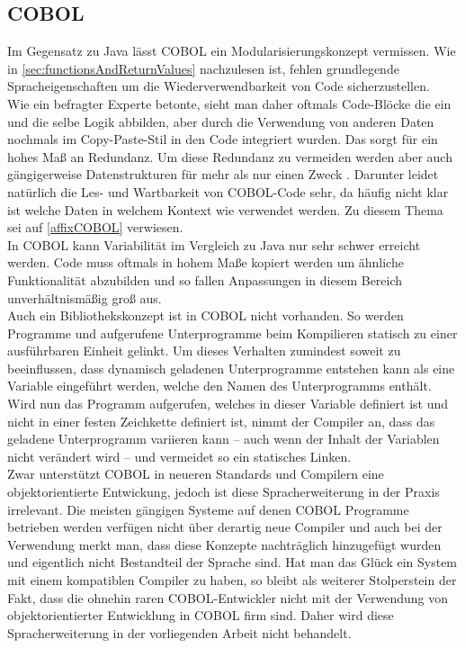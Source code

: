 \subsection*{COBOL}
Im Gegensatz zu Java lässt COBOL ein Modularisierungskonzept vermissen. Wie in \autoref{sec:functionsAndReturnValues} nachzulesen ist, fehlen grundlegende Spracheigenschaften um die Wiederverwendbarkeit von Code sicherzustellen. 
\\
Wie ein befragter Experte betonte, sieht man daher oftmals Code-Blöcke die ein und die selbe Logik abbilden, aber durch die Verwendung von anderen Daten nochmals im Copy-Paste-Stil in den Code integriert wurden. Das sorgt für ein hohes Maß an Redundanz. Um diese Redundanz zu vermeiden werden aber auch gängigerweise Datenstrukturen für mehr als nur einen Zweck . Darunter leidet natürlich die Les- und Wartbarkeit von COBOL-Code sehr, da häufig nicht klar ist welche Daten in welchem Kontext wie verwendet werden. Zu diesem Thema sei auf \autoref{affixCOBOL} verwiesen.
\\
In COBOL kann Variabilität im Vergleich zu Java nur sehr schwer erreicht werden. Code muss oftmals in hohem Maße kopiert werden um ähnliche Funktionalität abzubilden und so fallen Anpassungen in diesem Bereich unverhältnismäßig groß aus.
\\
Auch ein Bibliothekskonzept ist in COBOL nicht vorhanden. So werden Programme und aufgerufene Unterprogramme beim Kompilieren statisch zu einer ausführbaren Einheit gelinkt. Um dieses Verhalten zumindest soweit zu beeinflussen, dass dynamisch geladenen Unterprogramme entstehen kann als  eine Variable eingeführt werden, welche den Namen des Unterprogramms enthält. Wird nun das Programm aufgerufen, welches in dieser Variable definiert ist und nicht in einer festen Zeichkette definiert ist, nimmt der Compiler an, dass das geladene Unterprogramm variieren kann -- auch wenn der Inhalt der Variablen nicht verändert wird -- und vermeidet so ein statisches Linken.
\\
Zwar unterstützt COBOL in neueren Standards und Compilern eine objektorientierte Entwickung, jedoch ist diese Spracherweiterung in der Praxis irrelevant. Die meisten gängigen Systeme auf denen COBOL Programme betrieben werden verfügen nicht über derartig neue Compiler und auch bei der Verwendung merkt man, dass diese Konzepte nachträglich hinzugefügt wurden und eigentlich nicht Bestandteil der Sprache sind. Hat man das Glück ein System mit einem kompatiblen Compiler zu haben, so bleibt als weiterer Stolperstein der Fakt, dass die ohnehin raren COBOL-Entwickler nicht mit der Verwendung von objektorientierter Entwicklung in COBOL firm sind. Daher wird diese Spracherweiterung in der vorliegenden Arbeit nicht behandelt. 